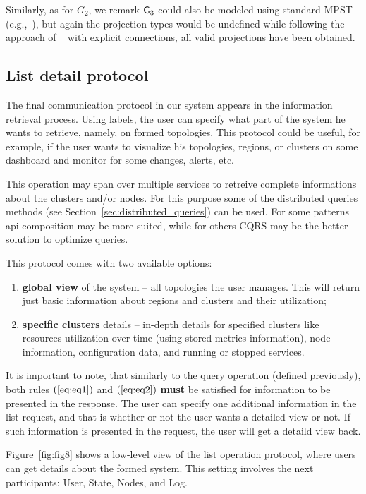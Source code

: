 \noindent
Similarly, as for $G_2$, we remark ${\sf G}_3$ could also be modeled using standard MPST (e.g.,~\cite{HondaYC08}), but again the projection types would be undefined while following the approach of ~\cite{HuY17} with explicit connections, all valid projections have been obtained.
%
%
\subsection{List detail protocol}\label{sec:list_detail_protocol}
%
The final communication protocol in our system appears in the information retrieval process. Using labels, the user can specify what part of the system he wants to retrieve, namely, on formed topologies. This protocol could be useful, for example, if the user wants to visualize his topologies, regions, or clusters on some dashboard and monitor for some changes, alerts, etc. 

This operation may span over multiple services to retreive complete informations about the clusters and/or nodes. For this purpose some of the distributed queries methods (see Section~\ref{sec:distributed_queries}) can be used. For some patterns api composition may be more suited, while for others CQRS may be the better solution to optimize queries.

This protocol comes with two available options: 

\begin{enumerate}[start=1,label={(\bfseries \arabic*)}]
	\item \textbf{global view} of the system -- all topologies the user manages. This will return just basic information about regions and clusters and their utilization;
	\item \textbf{specific clusters} details -- in-depth details for specified clusters like resources utilization over time (using stored metrics information), node information, configuration data, and running or stopped services.
\end{enumerate}

\noindent
It is important to note, that similarly to the query operation (defined previously), both rules $(\ref{eq:eq1})$ and $(\ref{eq:eq2})$ \textbf{must} be satisfied for information to be presented in the response. The user can specify one additional information in the list request, and that is whether or not the user wants a detailed view or not. If such information is presented in the request, the user will get a detaild view back. 

Figure~\ref{fig:fig8} shows a low-level view of the list operation protocol, where users can get details about the formed system. This setting involves the next participants: User, State, Nodes, and Log. 

